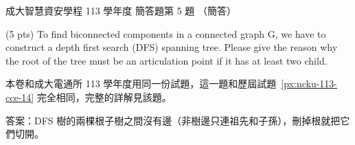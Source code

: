 \begin{pastexam}[label={px:ncku-113-isec-14}]{成大智慧資安學程 113 學年度 簡答題第 5 題}
（簡答）

(5 pts) To find biconnected components in a connected graph G, we have to construct a depth
first search (DFS) spanning tree. Please give the reason why the root of the tree must be an
articulation point if it has at least two child.
\end{pastexam}

\begin{pastsoln}
本卷和成大電通所 113 學年度用同一份試題，這一題和歷屆試題~\ref{px:ncku-113-cce-14} 完全相同，完整的詳解見該題。

答案：DFS 樹的兩棵根子樹之間沒有邊（非樹邊只連祖先和子孫），刪掉根就把它們切開。
\end{pastsoln}
